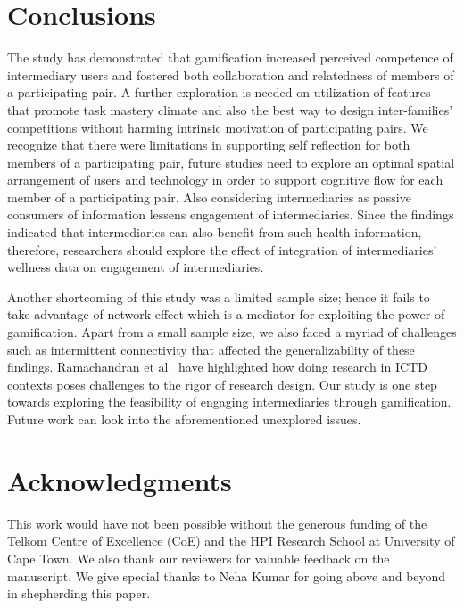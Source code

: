 \documentclass{sig-alternate}
\begin{document}
\section{Conclusions}
The study has demonstrated that gamification increased perceived competence of intermediary users and fostered both collaboration and relatedness of members of a participating pair. A further exploration is needed on utilization of features that promote task mastery climate and also the best way to design inter-families' competitions without harming intrinsic motivation of participating pairs. We recognize that there were limitations in supporting self reflection for both members of a participating pair, future studies need to explore an optimal spatial arrangement of users and technology in order to support cognitive flow for each member of a participating pair. Also considering intermediaries as passive consumers of information lessens engagement of intermediaries.  Since the findings indicated that intermediaries can also benefit from such health information, therefore, researchers should explore the effect of integration of intermediaries' wellness data on engagement of intermediaries.

Another shortcoming of this study was a limited sample size; hence it fails to take advantage of network effect which is a mediator for exploiting the power of gamification. Apart from a small sample size, we also faced a myriad of challenges such as intermittent connectivity that affected the generalizability of these findings. Ramachandran et al~\cite{ramachandran2010research} have highlighted how doing research in ICTD contexts poses challenges to the rigor of research design. Our study is one step towards exploring the feasibility of engaging intermediaries through gamification. Future work can look into the aforementioned unexplored issues. 

\section{Acknowledgments} 
This work would have not been possible without the generous funding of the Telkom Centre of Excellence (CoE) and the HPI Research School at University of Cape Town.  We also thank our reviewers for valuable feedback on the manuscript.  We give special thanks to Neha Kumar for going above and beyond in shepherding this paper.


%

%
%
\end{document}
